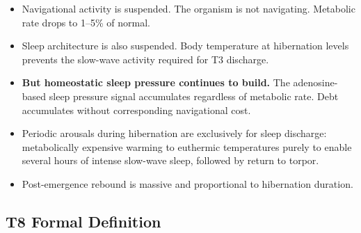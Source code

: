 \documentclass[10pt, a4paper]{article}
\begin{document}
\begin{itemize}[itemsep=0.2em]
  \item Navigational activity is
    suspended. The organism is not
    navigating. Metabolic rate drops
    to 1--5\% of normal.
  \item Sleep architecture is also
    suspended. Body temperature at
    hibernation levels prevents the
    slow-wave activity required for
    T3 discharge.
  \item \textbf{But homeostatic sleep
    pressure continues to build.}
    The adenosine-based sleep pressure
    signal accumulates regardless of
    metabolic rate. Debt accumulates
    without corresponding navigational
    cost.
  \item Periodic arousals during
    hibernation are exclusively for
    sleep discharge: metabolically
    expensive warming to euthermic
    temperatures purely to enable
    several hours of intense slow-wave
    sleep, followed by return to torpor.
  \item Post-emergence rebound is
    massive and proportional to
    hibernation duration.
\end{itemize}

\subsection{T8 Formal Definition}
\end{document}
